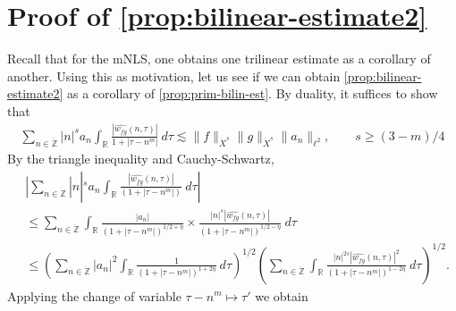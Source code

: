 \documentclass[12pt,reqno]{amsart}
\numberwithin{equation}{section}  %
\numberwithin{figure}{section}
\newcommand{\rr}{\mathbb{R}}
\newcommand{\zz}{\mathbb{Z}}
\newcommand{\zzdot}{\dot{\zz}}
\newcommand{\wh}{\widehat}
\theoremstyle{plain}
\theoremstyle{definition}
\theoremstyle{remark}
\begin{document}
\section{Proof of \autoref{prop:bilinear-estimate2}}
Recall that for the mNLS, one obtains one trilinear estimate as a corollary of
another. Using this as motivation, let us see if we can obtain
\autoref{prop:bilinear-estimate2} as a corollary of
\autoref{prop:prim-bilin-est}. By
duality, it suffices to show that
%
\begin{equation}
	\label{duality-est}
	\begin{split}
		\sum_{n \in \zzdot}  |n|^{s}
		a_n \int_{\rr} \frac{|\wh{w_{fg}}(n, \tau)|}{1 
		+ | \tau - n^{m } |} \ d \tau \lesssim \|f\|_{\dot{X}^s} \|g\|_{\dot{X}^s}
		\|a_n \|_{\ell^2}, \qquad s \ge (3-m)/4 
	\end{split}
\end{equation}
%
By the triangle inequality 
and Cauchy-Schwartz,
%
\begin{equation}
	\label{1m}
	\begin{split}
		& | \sum_{n \in \zzdot} |n|^{s} a_n
		\int_{\rr}\frac{| \wh{w_{fg}}(n, \tau) |}{(1 + | \tau - n^{m } |)} \ d \tau |
		\\
		& \le \sum_{n \in \zzdot} \int_{\rr} \frac{| a_n |}{\left( 1 + 
		| \tau - n^{m } |
		\right)^{1/2 + \eta}} \times \frac{| n|^s  |
		\wh{w_{fg}}(n, \tau) |}{\left( 
		1 + | \tau - n^{m } | \right)^{1/2 - \eta}} \ d \tau
		\\
		& \le \left( \sum_{n \in \zzdot} | a_{n} |^2\int_{\rr} \frac{1}{\left( 1 + |
		\tau - n^{m } | \right)^{1 + 2 \eta}} \ d \tau  
		\right)^{1/2} 
		\left ( \sum_{n \in \zzdot}\int_{\rr} \frac{|n|^{2s} | \wh{w_{fg}}(n, \tau) 
		|^2}{\left( 1 + | \tau - n^{m } | \right)^{1 -2 \eta}}\ d \tau 
		\right)^{1/2}.
	\end{split}
\end{equation}
%
Applying the change of variable $\tau - n^{m }
\mapsto \tau'$ we obtain  
\end{document}

